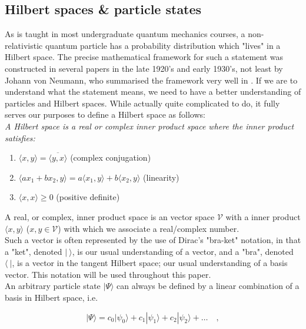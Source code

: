 \documentclass[10pt,twoside]{report}
\begin{document}
	\subsection{Hilbert spaces \& particle states}
	As is taught in most undergraduate quantum mechanics courses, a non-relativistic quantum particle has a probability distribution which "lives" in a Hilbert space. The precise mathematical framework for such a statement was constructed in several papers in the late 1920's and early 1930's, not least by Johann von Neumann, who summarised the framework very well in \cite{Neumann32}. If we are to understand what the statement means, we need to have a better understanding of particles and Hilbert spaces. While actually quite complicated to do, it fully serves our purposes to define a Hilbert space as follows:\\
	
	\emph{A Hilbert space is a real or complex inner product space where the inner product satisfies:}
	\begin{enumerate}
		\item $\langle x,y\rangle = \overbar{\langle y,x\rangle}$ (complex conjugation)
		\item $\langle ax_1 + bx_2,y\rangle = a\langle x_1,y\rangle + b\langle x_2,y\rangle$ (linearity)
		\item $\langle x,x\rangle \geq 0$ (positive definite)
	\end{enumerate}
	
	A real, or complex, inner product space is an vector space $\mathcal{V}$ with a inner product $\langle x,y\rangle$ ($x,y \in \mathcal{V}$) with which we associate a real/complex number.\\
	
	Such a vector is often represented by the use of Dirac's "bra-ket" notation, in that a "ket", denoted $|\:\rangle$, is our usual understanding of a vector, and a "bra", denoted $\langle\:|$, is a vector in the tangent Hilbert space; our usual understanding of a basis vector. This notation will be used throughout this paper.\\
	
	An arbitrary particle state $|\Psi\rangle$ can always be defined by a linear combination of a basis in Hilbert space, i.e.
	
	\begin{equation}
		|\Psi\rangle = c_0|\psi_0\rangle + c_1|\psi_1\rangle + c_2|\psi_2\rangle + \ldots \quad,
	\end{equation}
	
\end{document}
